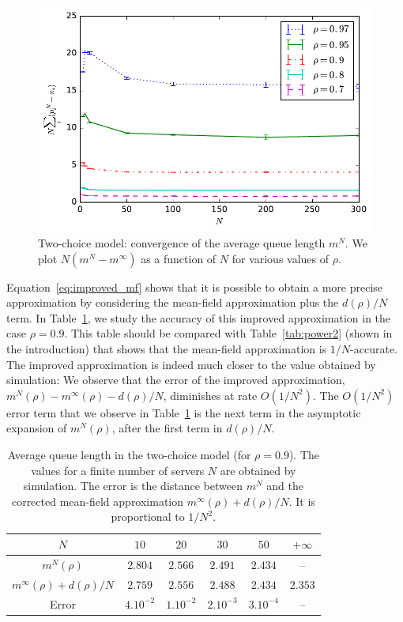 \documentclass[sigconf]{acmart}
\begin{document}
\begin{figure}[t]
  \centering
  \includegraphics[width=\linewidth]{2choice_convergence_mean_noLog}
  \caption{Two-choice model: convergence of the average queue length
    $m^N$. We plot $N(m^N-m^{\infty})$ as a function of $N$ for
    various values of $\rho$.  }
  \label{fig:2-choice_mean}
\end{figure}


Equation~\eqref{eq:improved_mf} shows that it is possible to obtain a
more precise approximation by considering the mean-field approximation
plus the $d(\rho)/N$ term. In Table~\ref{tab:2}, we study the accuracy
of this improved approximation in the case $\rho=0.9$. This table
should be compared with Table~\ref{tab:power2} (shown in the
introduction) that shows that the mean-field approximation is
$1/N$-accurate. The improved approximation is indeed much closer to
the value obtained by simulation: We observe that the error of the
improved approximation, $m^N(\rho)-m^{\infty}(\rho)-d(\rho)/N$,
diminishes at rate $O(1/N^2)$.  The $O(1/N^2)$ error term that we
observe in Table~\ref{tab:2} is the next term in the asymptotic
expansion of $m^N(\rho)$, after the first term in $d(\rho)/N$.


\begin{table}[t]
  \centering
  \begin{tabular}{@{}|@{}c@{}|c|c|c|c|c|}
    \hline
    $N$
    &$  10$  &$  20$  &$  30$  &$  50$ & $+\infty$  \\\hline $m^N(\rho)$
    &$2.804$ &$2.566$ &$2.491$ &$2.434$&-- \\\hline $m^\infty(\rho){+}d(\rho)/N$ 
    &$2.759$ &$2.556$ &$2.488$ &$2.434$&$2.353$ \\\hline Error
    &$4. 10^{-2}$&$1 . 10^{-2}$&$2 .10^{-3}$&$3 . 10^{-4}$&--\\
    \hline
  \end{tabular}
  \caption{Average queue length in the two-choice model (for
    $\rho=0.9$). The values for a finite number of servers  $N$ are obtained by
    simulation. The error is the distance between $m^N$ and the
    corrected mean-field approximation $m^\infty(\rho)+d(\rho)/N$. It is
    proportional to $1/N^2$.}
  \label{tab:2}
\end{table}
\end{document}
